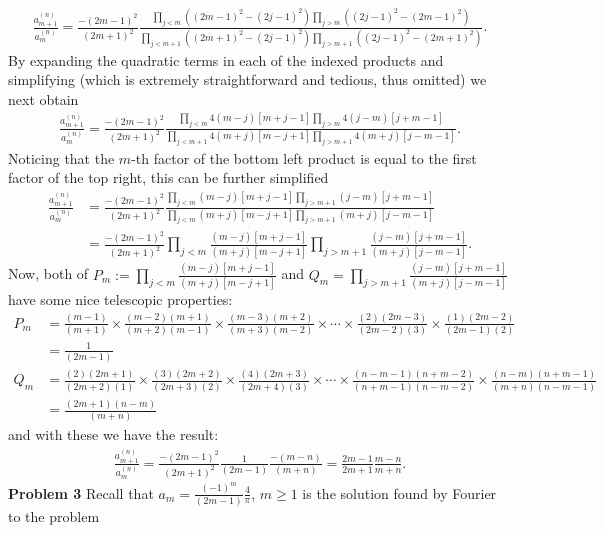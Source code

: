 \documentclass[10pt]{article}
\newcommand{\1}[1]{\mathbbm{1}_{#1}}
\begin{document}
    \begin{align*}
        \frac{a^{(n)}_{m+1}}{a^{(n)}_m}=\frac{-(2m-1)^2}{(2m+1)^2}\frac{\prod_{j<m}((2m-1)^2-(2j-1)^2)\prod_{j>m}((2j-1)^2-(2m-1)^2)}{\prod_{j<m+1}((2m+1)^2-(2j-1)^2)\prod_{j>m+1}((2j-1)^2-(2m+1)^2)}.
    \end{align*}
    By expanding the quadratic terms in each of the indexed products and simplifying (which is extremely straightforward and tedious, thus omitted) we next obtain
    \begin{align*}
        \frac{a^{(n)}_{m+1}}{a^{(n)}_m}=\frac{-(2m-1)^2}{(2m+1)^2}\frac{\prod_{j<m}4(m-j)[m+j-1]\prod_{j>m}4(j-m)[j+m-1]}{\prod_{j<m+1}4(m+j)[m-j+1]\prod_{j>m+1}4(m+j)[j-m-1]}.
    \end{align*}
    Noticing that the $m$-th factor of the bottom left product is equal to the first factor of the top right, this can be further simplified
    \begin{align*}
        \frac{a^{(n)}_{m+1}}{a^{(n)}_m}&=\frac{-(2m-1)^2}{(2m+1)^2}\frac{\prod_{j<m}(m-j)[m+j-1]\prod_{j>m+1}(j-m)[j+m-1]}{\prod_{j<m}(m+j)[m-j+1]\prod_{j>m+1}(m+j)[j-m-1]}\\
        &=\frac{-(2m-1)^2}{(2m+1)^2}\prod_{j<m}\frac{(m-j)[m+j-1]}{(m+j)[m-j+1]}\prod_{j>m+1}\frac{(j-m)[j+m-1]}{(m+j)[j-m-1]}.
    \end{align*}
    Now, both of $P_m:=\prod_{j<m}\tfrac{(m-j)[m+j-1]}{(m+j)[m-j+1]}$ and $Q_m=\prod_{j>m+1}\tfrac{(j-m)[j+m-1]}{(m+j)[j-m-1]}$ have some nice telescopic properties:
    \begin{align*}
        P_m&=\frac{(m-1)}{(m+1)}\times\frac{(m-2)(m+1)}{(m+2)(m-1)}\times\frac{(m-3)(m+2)}{(m+3)(m-2)}\times\cdots\times\frac{(2)(2m-3)}{(2m-2)(3)}\times\frac{(1)(2m-2)}{(2m-1)(2)}\\
        &=\frac{1}{(2m-1)}\\
        Q_m&=\frac{(2)(2m+1)}{(2m+2)(1)}\times\frac{(3)(2m+2)}{(2m+3)(2)}\times\frac{(4)(2m+3)}{(2m+4)(3)}\times\cdots\times\frac{(n-m-1)(n+m-2)}{(n+m-1)(n-m-2)}\times\frac{(n-m)(n+m-1)}{(m+n)(n-m-1)}\\
        &=\frac{(2m+1)(n-m)}{(m+n)}
    \end{align*}
    and with these we have the result:
    \begin{align*}
        \frac{a^{(n)}_{m+1}}{a^{(n)}_m}=\frac{-(2m-1)^2}{(2m+1)^2}\frac{1}{(2m-1)}\frac{-(m-n)}{(m+n)}=\frac{2m-1}{2m+1}\frac{m-n}{m+n}.\tag*{$\qed$}
    \end{align*}
    {\bf Problem 3} Recall that $a_m=\tfrac{(-1)^m}{(2m-1)}\tfrac{4}{\pi}$, $m\geq 1$ is the solution found by Fourier to the problem
\end{document}
